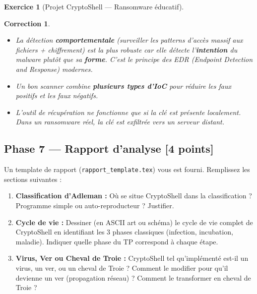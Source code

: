 \documentclass[a4paper,11pt]{article}
\theoremstyle{plain}
\newtheorem{correction}{Correction}
\theoremstyle{definition}
\newtheorem{exercice}{Exercice}
\begin{document}
\begin{exercice}[Projet CryptoShell --- Ransomware éducatif]
\begin{correction}
\begin{pointcle}
\begin{itemize}
    \item La détection \textbf{comportementale} (surveiller les patterns d'accès massif aux fichiers + chiffrement) est la plus robuste car elle détecte l'\textbf{intention} du malware plutôt que sa \textbf{forme}. C'est le principe des EDR (\textit{Endpoint Detection and Response}) modernes.
    \item Un bon scanner combine \textbf{plusieurs types d'IoC} pour réduire les faux positifs et les faux négatifs.
    \item L'outil de récupération ne fonctionne que si la clé est présente localement. Dans un ransomware réel, la clé est exfiltrée vers un serveur distant.
\end{itemize}
\end{pointcle}

\end{correction}



\subsection*{Phase 7 --- Rapport d'analyse \hfill \normalsize [4 points]}

\noindent Un template de rapport (\texttt{rapport\_template.tex}) vous est fourni. Remplissez les sections suivantes :

\begin{enumerate}
\item[\textbf{R1)}] \textbf{Classification d'Adleman :} Où se situe CryptoShell dans la classification ? Programme simple ou auto-reproducteur ? Justifier.

\item[\textbf{R2)}] \textbf{Cycle de vie :} Dessiner (en ASCII art ou schéma) le cycle de vie complet de CryptoShell en identifiant les 3 phases classiques (infection, incubation, maladie). Indiquer quelle phase du TP correspond à chaque étape.

\item[\textbf{R3)}] \textbf{Virus, Ver ou Cheval de Troie :} CryptoShell tel qu'implémenté est-il un virus, un ver, ou un cheval de Troie ? Comment le modifier pour qu'il devienne un ver (propagation réseau) ? Comment le transformer en cheval de Troie ?


\end{enumerate}
\end{exercice}
\end{document}
